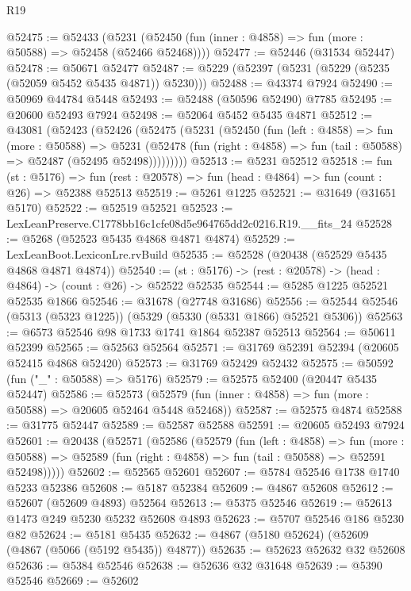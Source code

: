 \begin{lexlean}{R19}
\begin{coremodule}
@52475 := @52433
    (@5231 (@52450 (fun (inner : @4858) => fun (more : @50588) => @52458 (@52466 @52468))))
@52477 := @52446 (@31534 @52447)
@52478 := @50671 @52477
@52487 := @5229 (@52397 (@5231 (@5229 (@5235 (@52059 @5452 @5435 @4871)) @5230)))
@52488 := @43374 @7924
@52490 := @50969 @44784 @5448
@52493 := @52488 (@50596 @52490) @7785
@52495 := @20600 @52493 @7924
@52498 := @52064 @5452 @5435 @4871
@52512 := @43081
    (@52423
      (@52426
        (@52475
          (@5231
            (@52450
              (fun (left : @4858) =>
              fun (more : @50588) =>
              @5231
                (@52478
                  (fun (right : @4858) => fun (tail : @50588) => @52487 (@52495 @52498)))))))))
@52513 := @5231 @52512
@52518 := fun (st : @5176) =>
  fun (rest : @20578) => fun (head : @4864) => fun (count : @26) => @52388 @52513
@52519 := @5261 @1225
@52521 := @31649 (@31651 @5170)
@52522 := @52519 @52521
@52523 := LexLeanPreserve.C1778bb16c1cfe08d5e964765dd2c0216.R19.__fits_24
@52528 := @5268 (@52523 @5435 @4868 @4871 @4874)
@52529 := LexLeanBoot.LexiconLre.rvBuild
@52535 := @52528 (@20438 (@52529 @5435 @4868 @4871 @4874))
@52540 := (st : @5176) -> (rest : @20578) -> (head : @4864) -> (count : @26) -> @52522 @52535
@52544 := @5285 @1225 @52521 @52535 @1866
@52546 := @31678 (@27748 @31686)
@52556 := @52544 @52546 (@5313 (@5323 @1225)) (@5329 (@5330 (@5331 @1866) @52521 @5306))
@52563 := @6573 @52546 @98 @1733 @1741 @1864 @52387 @52513
@52564 := @50611 @52399
@52565 := @52563 @52564
@52571 := @31769 @52391 @52394 (@20605 @52415 @4868 @52420)
@52573 := @31769 @52429 @52432
@52575 := @50592 (fun ("_" : @50588) => @5176)
@52579 := @52575 @52400 (@20447 @5435 @52447)
@52586 := @52573 (@52579 (fun (inner : @4858) => fun (more : @50588) => @20605 @52464 @5448 @52468))
@52587 := @52575 @4874
@52588 := @31775 @52447
@52589 := @52587 @52588
@52591 := @20605 @52493 @7924
@52601 := @20438
    (@52571
      (@52586
        (@52579
          (fun (left : @4858) =>
          fun (more : @50588) =>
          @52589 (fun (right : @4858) => fun (tail : @50588) => @52591 @52498)))))
@52602 := @52565 @52601
@52607 := @5784 @52546 @1738 @1740 @5233 @52386
@52608 := @5187 @52384
@52609 := @4867 @52608
@52612 := @52607 (@52609 @4893) @52564
@52613 := @5375 @52546
@52619 := @52613 @1473 @249 @5230 @5232 @52608 @4893
@52623 := @5707 @52546 @186 @5230 @82
@52624 := @5181 @5435
@52632 := @4867 (@5180 @52624) (@52609 (@4867 (@5066 (@5192 @5435)) @4877))
@52635 := @52623 @52632 @32 @52608
@52636 := @5384 @52546
@52638 := @52636 @32 @31648
@52639 := @5390 @52546
@52669 := @52602

\end{coremodule}
\end{lexlean}
